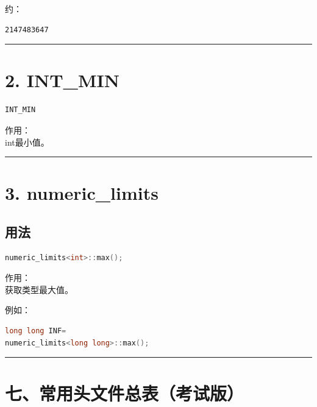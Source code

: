 \documentclass[9pt,twocolumn]{extarticle}
\begin{document}
约：
\begin{lstlisting}
2147483647
\end{lstlisting}

\noindent\rule{\linewidth}{0.4pt}

\section{2. INT\_MIN}
\begin{lstlisting}[language=C++]
INT_MIN
\end{lstlisting}
作用：\\
int最小值。

\noindent\rule{\linewidth}{0.4pt}

\section{3. numeric\_limits}

\subsection{用法}
\begin{lstlisting}[language=C++]
numeric_limits<int>::max();
\end{lstlisting}
作用：\\
获取类型最大值。

例如：
\begin{lstlisting}[language=C++]
long long INF=
numeric_limits<long long>::max();
\end{lstlisting}

\noindent\rule{\linewidth}{0.4pt}

\section{七、常用头文件总表（考试版）}
\end{document}
